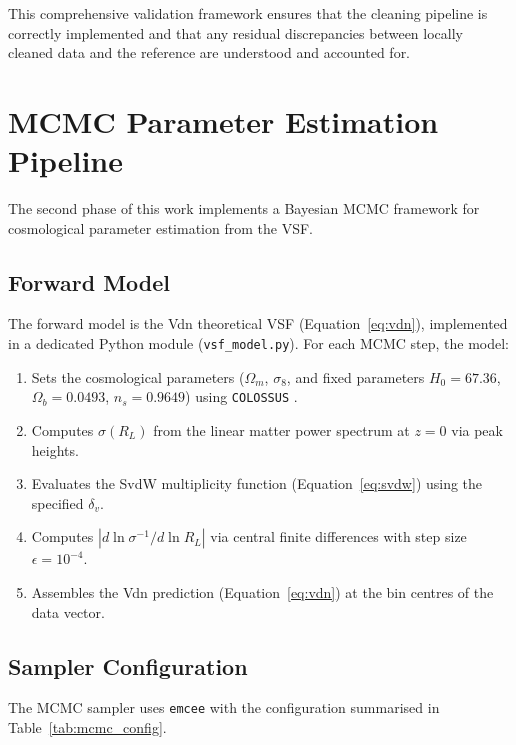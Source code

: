 \documentclass[12pt]{report}
\begin{document}
This comprehensive validation framework ensures that the cleaning pipeline is correctly implemented and that any residual discrepancies between locally cleaned data and the reference are understood and accounted for.


\section{MCMC Parameter Estimation Pipeline}
\label{sec:mcmc_pipeline}

The second phase of this work implements a Bayesian MCMC framework for cosmological parameter estimation from the VSF.

\subsection{Forward Model}

The forward model is the Vdn theoretical VSF (Equation~\ref{eq:vdn}), implemented in a dedicated Python module (\texttt{vsf\_model.py}). For each MCMC step, the model:
\begin{enumerate}
    \item Sets the cosmological parameters ($\Omega_m$, $\sigma_8$, and fixed parameters $H_0 = 67.36$, $\Omega_b = 0.0493$, $n_s = 0.9649$) using \texttt{COLOSSUS} \citep{Diemer2018}.
    \item Computes $\sigma(R_L)$ from the linear matter power spectrum at $z = 0$ via peak heights.
    \item Evaluates the SvdW multiplicity function (Equation~\ref{eq:svdw}) using the specified $\delta_v$.
    \item Computes $|d\ln\sigma^{-1}/d\ln R_L|$ via central finite differences with step size $\epsilon = 10^{-4}$.
    \item Assembles the Vdn prediction (Equation~\ref{eq:vdn}) at the bin centres of the data vector.
\end{enumerate}

\subsection{Sampler Configuration}

The MCMC sampler uses \texttt{emcee} \citep{ForemanMackey2013} with the configuration summarised in Table~\ref{tab:mcmc_config}.
\end{document}
